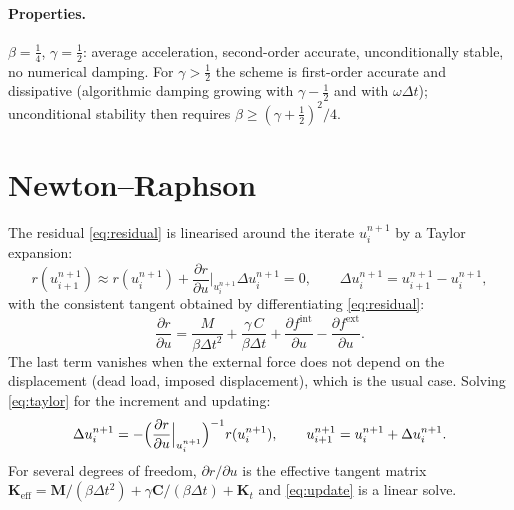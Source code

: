 \documentclass[11pt,a4paper]{article}
\begin{document}
\paragraph{Properties.}
$\beta = \tfrac14$, $\gamma = \tfrac12$: average acceleration, second-order accurate,
unconditionally stable, no numerical damping. For $\gamma > \tfrac12$ the scheme is first-order
accurate and dissipative (algorithmic damping growing with $\gamma-\tfrac12$ and with
$\omega\Delta t$); unconditional stability then requires $\beta \ge (\gamma+\tfrac12)^2/4$.

\section{Newton--Raphson}
The residual \eqref{eq:residual} is linearised around the iterate $u_i^{n+1}$ by a Taylor
expansion:
\begin{equation}
  r(u_{i+1}^{n+1}) \approx r(u_i^{n+1}) + \frac{\partial r}{\partial u}\Big|_{u_i^{n+1}}\Delta u_i^{n+1} = 0,
  \qquad \Delta u_i^{n+1} = u_{i+1}^{n+1} - u_i^{n+1},
  \label{eq:taylor}
\end{equation}
with the consistent tangent obtained by differentiating \eqref{eq:residual}:
\begin{equation}
  \frac{\partial r}{\partial u} = \frac{M}{\beta\Delta t^2} + \frac{\gamma\,C}{\beta\Delta t}
  + \frac{\partial f^{\text{int}}}{\partial u} - \frac{\partial f^{\text{ext}}}{\partial u} .
  \label{eq:tangent}
\end{equation}
The last term vanishes when the external force does not depend on the displacement (dead
load, imposed displacement), which is the usual case. Solving \eqref{eq:taylor} for the
increment and updating:
\begin{equation}
  \Delta u_i^{n+1} = -\Bigl(\frac{\partial r}{\partial u}\Big|_{u_i^{n+1}}\Bigr)^{-1} r(u_i^{n+1}),
  \qquad
  u_{i+1}^{n+1} = u_i^{n+1} + \Delta u_i^{n+1}.
  \label{eq:update}
\end{equation}
For several degrees of freedom, $\partial r/\partial u$ is the effective tangent matrix
$\mathbf K_{\text{eff}} = \mathbf M/(\beta\Delta t^2) + \gamma\mathbf C/(\beta\Delta t) + \mathbf K_t$
and \eqref{eq:update} is a linear solve.
\end{document}
